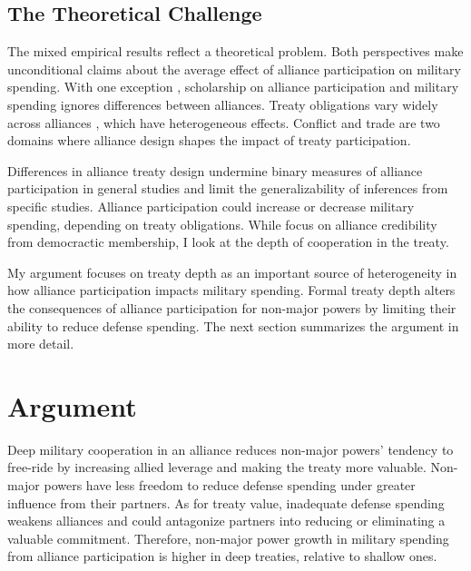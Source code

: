\documentclass[12pt]{article}
\begin{document}
\subsection{The Theoretical Challenge}


The mixed empirical results reflect a theoretical problem. 
Both perspectives make unconditional claims about the average effect of alliance participation on military spending.  
With one exception \citep{DigiuseppePoast2016}, scholarship on alliance participation and military spending ignores differences between alliances.
Treaty obligations vary widely across alliances \citep{Leedsetal2002}, which have heterogeneous effects. 
Conflict \citep{Leeds2003, Benson2012} and trade \citep{Long2003, LongLeeds2006} are two domains where alliance design shapes the impact of treaty participation. 


Differences in alliance treaty design undermine binary measures of alliance participation in general studies and limit the generalizability of inferences from specific studies. 
Alliance participation could increase or decrease military spending, depending on treaty obligations. 
While \citet{DigiuseppePoast2016} focus on alliance credibility from democractic membership, I look at the depth of cooperation in the treaty. 


My argument focuses on treaty depth as an important source of heterogeneity in how alliance participation impacts military spending. 
Formal treaty depth alters the consequences of alliance participation for non-major powers by limiting their ability to reduce defense spending. 
The next section summarizes the argument in more detail. 



\section{Argument}

Deep military cooperation in an alliance reduces non-major powers' tendency to free-ride by increasing allied leverage and making the treaty more valuable. 
Non-major powers have less freedom to reduce defense spending under greater influence from their partners. 
As for treaty value, inadequate defense spending weakens alliances and could antagonize partners into reducing or eliminating a valuable commitment. 
Therefore, non-major power growth in military spending from alliance participation is higher in deep treaties, relative to shallow ones. 
\end{document}
